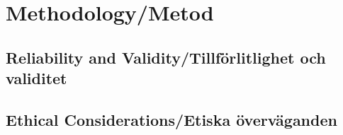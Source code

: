 \chapter{Methodology/Metod}\label{chapter2}

\lipsum[20]

\section{Reliability and Validity/Tillförlitlighet och validitet}

\lipsum[21]

\section{Ethical Considerations/Etiska överväganden}

\lipsum[22]